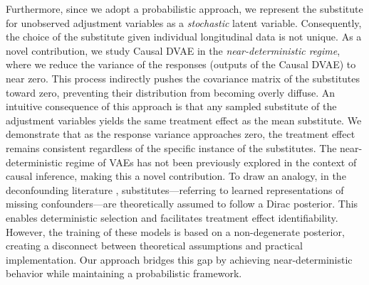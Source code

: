 \documentclass[10pt]{article} %
\begin{document}
Furthermore, since we adopt a probabilistic approach, we represent the substitute for unobserved adjustment variables as a \emph{stochastic} latent variable. Consequently, the choice of the substitute given individual longitudinal data is not unique.  As a novel contribution, we study Causal DVAE in the \emph{near-deterministic regime}, where we reduce the variance of the responses (outputs of the Causal DVAE) to near zero. This process indirectly pushes the covariance matrix of the substitutes toward zero, preventing their distribution from becoming overly diffuse. An intuitive consequence of this approach is that any sampled substitute of the adjustment variables yields the same treatment effect as the mean substitute. We demonstrate that as the response variance approaches zero, the treatment effect remains consistent regardless of the specific instance of the substitutes. The near-deterministic regime of VAEs has not been previously explored in the context of causal inference, making this a novel contribution. To draw an analogy, in the deconfounding literature \citep{lopezmultipletreatments, ranganath2018multiple, wang2019blessings, zhang2019medicalDeconf, Bica2020TimeSDecounf, hatt2024sequential}, substitutes—referring to learned representations of missing confounders—are theoretically assumed to follow a Dirac posterior. This enables deterministic selection and facilitates treatment effect identifiability. However, the training of these models is based on a non-degenerate posterior, creating a disconnect between theoretical assumptions and practical implementation. Our approach bridges this gap by achieving near-deterministic behavior while maintaining a probabilistic framework.  
\end{document}
